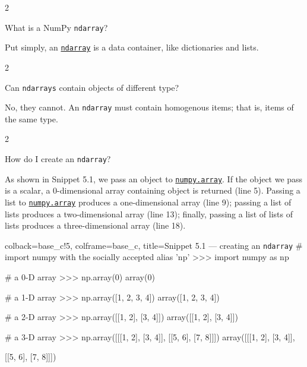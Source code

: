 \documentclass[a4paper,11pt]{book}
\newcommand{\question}[1]{%
    \begin{tcolorbox}[colback=comp_c!10,colframe=comp_c,sidebyside align=top,width=\linewidth,before skip=1ex]
        #1
    \end{tcolorbox}
    \switchcolumn%
}
\newcommand{\note}[1]{%
    \begin{tcolorbox}[colback=white!0,colframe=white!10,width=\linewidth,before skip=1ex]
        #1
    \end{tcolorbox}
}
\begin{document}
\begin{paracol}{2}
	\question{\raggedright What is a NumPy \texttt{ndarray}?}
	\note{Put simply, an \href{https://numpy.org/doc/stable/reference/arrays.ndarray.html}{\texttt{ndarray}} is a data container, like dictionaries and lists.}
\end{paracol}

\begin{paracol}{2}
	\question{\raggedright Can \texttt{ndarrays} contain objects of different type?}
	\note{No, they cannot. An \texttt{ndarray} must contain homogenous items; that is, items of the same type.}
\end{paracol}

\begin{paracol}{2}
	\question{\raggedright How do I create an \texttt{ndarray}?}
	\note{As shown in Snippet 5.1, we pass an object to \href{https://numpy.org/doc/stable/reference/generated/numpy.array.html\#numpy.array}{\texttt{numpy.array}}. If the object we pass is a scalar, a 0-dimensional array containing object is returned (line 5). Passing a list to \href{https://numpy.org/doc/stable/reference/generated/numpy.array.html\#numpy.array}{\texttt{numpy.array}} produces a one-dimensional array (line 9); passing a list of lists produces a two-dimensional array (line 13); finally, passing a list of lists of lists produces a three-dimensional array (line 18).}
\end{paracol}

\begin{pythoncode}[linenos=true,]{colback=base_c!5, colframe=base_c, title=\sffamily Snippet 5.1 --- creating an \texttt{ndarray}}
# import numpy with the socially accepted alias 'np'
>>> import numpy as np
	
# a 0-D array
>>> np.array(0)
array(0)

# a 1-D array
>>> np.array([1, 2, 3, 4])
array([1, 2, 3, 4])

# a 2-D array
>>> np.array([[1, 2], [3, 4]])
array([[1, 2],
       [3, 4]])

# a 3-D array
>>> np.array([[[1, 2], [3, 4]], [[5, 6], [7, 8]]])
array([[[1, 2],
        [3, 4]],

       [[5, 6],
        [7, 8]]])

\end{pythoncode}
\clearpage
\end{document}
